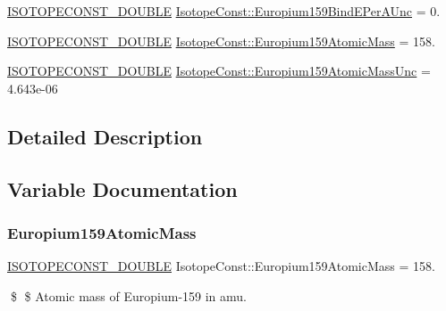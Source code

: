 \begin{DoxyCompactItemize}
\mbox{\hyperlink{group___isotope_const-_macros_ga8f45a7272ce02c0b4c65c44636ed719a}{I\+S\+O\+T\+O\+P\+E\+C\+O\+N\+S\+T\+\_\+\+D\+O\+U\+B\+LE}} \mbox{\hyperlink{group___isotope_const-_europium-_eu159_ga4a0a2c7c7184b4494669ac28b3478cc2}{Isotope\+Const\+::\+Europium159\+Bind\+E\+Per\+A\+Unc}} = 0.
\item 
\mbox{\hyperlink{group___isotope_const-_macros_ga8f45a7272ce02c0b4c65c44636ed719a}{I\+S\+O\+T\+O\+P\+E\+C\+O\+N\+S\+T\+\_\+\+D\+O\+U\+B\+LE}} \mbox{\hyperlink{group___isotope_const-_europium-_eu159_gaea3ac6efc6cacaf10d2fa5e8ce55c386}{Isotope\+Const\+::\+Europium159\+Atomic\+Mass}} = 158.
\item 
\mbox{\hyperlink{group___isotope_const-_macros_ga8f45a7272ce02c0b4c65c44636ed719a}{I\+S\+O\+T\+O\+P\+E\+C\+O\+N\+S\+T\+\_\+\+D\+O\+U\+B\+LE}} \mbox{\hyperlink{group___isotope_const-_europium-_eu159_ga1d99fd5a0f32ef9056b7c8c6c8d283e4}{Isotope\+Const\+::\+Europium159\+Atomic\+Mass\+Unc}} = 4.\+643e-\/06
\end{DoxyCompactItemize}


\subsection{Detailed Description}


\subsection{Variable Documentation}
\mbox{\label{group___isotope_const-_europium-_eu159_gaea3ac6efc6cacaf10d2fa5e8ce55c386}} 
\subsubsection{\texorpdfstring{Europium159\+Atomic\+Mass}{Europium159AtomicMass}}
{\footnotesize\ttfamily \mbox{\hyperlink{group___isotope_const-_macros_ga8f45a7272ce02c0b4c65c44636ed719a}{I\+S\+O\+T\+O\+P\+E\+C\+O\+N\+S\+T\+\_\+\+D\+O\+U\+B\+LE}} Isotope\+Const\+::\+Europium159\+Atomic\+Mass = 158.}

\$ \$ Atomic mass of Europium-\/159 in amu. \mbox{\label{group___isotope_const-_europium-_eu159_ga1d99fd5a0f32ef9056b7c8c6c8d283e4}} 
